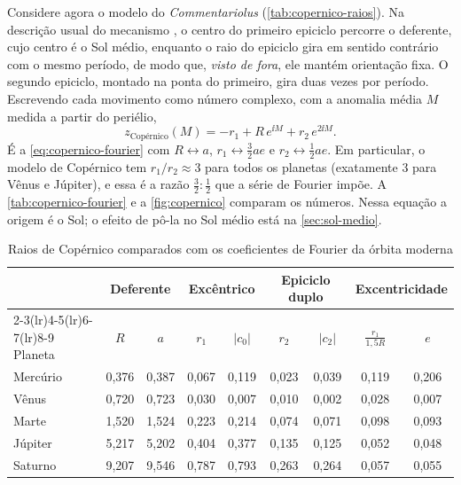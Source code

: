 Considere agora o modelo do \emph{Commentariolus} (\autoref{tab:copernico-raios}). Na descrição usual do mecanismo \cite{gallavotti2001,sugon2008}, o centro do primeiro epiciclo percorre o deferente, cujo centro é o Sol médio, enquanto o raio do epiciclo gira em sentido contrário com o mesmo período, de modo que, \emph{visto de fora}, ele mantém orientação fixa. O segundo epiciclo, montado na ponta do primeiro, gira duas vezes por período. Escrevendo cada movimento como número complexo, com a anomalia média $M$ medida a partir do periélio,
\begin{equation}
  z_\text{Copérnico}(M) = -r_1 + R\,e^{\ii M} + r_2\,e^{2\ii M}.
  \label{eq:copernico-modelo}
\end{equation}
É a \autoref{eq:copernico-fourier} com $R \leftrightarrow a$, $r_1 \leftrightarrow \frac32 ae$ e $r_2 \leftrightarrow \frac12 ae$. Em particular, o modelo de Copérnico tem $r_1/r_2 \approx 3$ para todos os planetas (exatamente 3 para Vênus e Júpiter), e essa é a razão $\frac32 : \frac12$ que a série de Fourier impõe. A \autoref{tab:copernico-fourier} e a \autoref{fig:copernico} comparam os números. Nessa equação a origem é o Sol; o efeito de pô-la no Sol médio está na \autoref{sec:sol-medio}.

\begin{table}[htb]
  \centering
  \caption{Raios de Copérnico comparados com os coeficientes de Fourier da órbita moderna}
  \label{tab:copernico-fourier}
  \small
  \setlength{\tabcolsep}{4.5pt}
  \begin{tabular}{l cc cc cc cc}
    \toprule
    & \multicolumn{2}{c}{Deferente} & \multicolumn{2}{c}{Excêntrico} & \multicolumn{2}{c}{Epiciclo duplo} & \multicolumn{2}{c}{Excentricidade} \\
    \cmidrule(lr){2-3}\cmidrule(lr){4-5}\cmidrule(lr){6-7}\cmidrule(lr){8-9}
    Planeta & $R$ & $a$ & $r_1$ & $|c_0|$ & $r_2$ & $|c_2|$ & $\frac{r_1}{1{,}5R}$ & $e$ \\
    \midrule
    Mercúrio & 0,376 & 0,387 & 0,067 & 0,119 & 0,023 & 0,039 & 0,119 & 0,206 \\
    Vênus    & 0,720 & 0,723 & 0,030 & 0,007 & 0,010 & 0,002 & 0,028 & 0,007 \\
    Marte    & 1,520 & 1,524 & 0,223 & 0,214 & 0,074 & 0,071 & 0,098 & 0,093 \\
    Júpiter  & 5,217 & 5,202 & 0,404 & 0,377 & 0,135 & 0,125 & 0,052 & 0,048 \\
    Saturno  & 9,207 & 9,546 & 0,787 & 0,793 & 0,263 & 0,264 & 0,057 & 0,055 \\
    \bottomrule
  \end{tabular}
\end{table}

